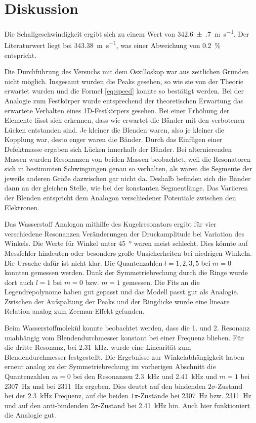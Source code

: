 \section{Diskussion}
\label{sec:Diskussion}

Die Schallgeschwindigkeit ergibt sich zu einem Wert von \SI{342.6(7)}{\meter\per\second}. Der Literaturwert liegt bei \SI{343.38}{\meter\per\second}, was einer Abweichung von \SI{0.2}{\percent} entspricht. 

Die Durchführung des Versuchs mit dem Oszilloskop war aus zeitlichen Gründen nicht möglich. 
Insgesamt wurden die Peaks gesehen, so wie sie von der Theorie erwartet wurden und die Formel \eqref{eq:speed} konnte so bestätigt werden. 
Bei der Analogie zum Festkörper wurde entsprechend der theoretischen Erwartung das erwartete Verhalten eines 1D-Festkörpers gesehen. Bei einer Erhöhung der Elemente lässt sich erkennen, dass wie erwartet die Bänder mit den verbotenen Lücken entstanden sind. Je kleiner die Blenden waren, also je kleiner die Kopplung war, desto enger waren die Bänder. 
Durch das Einfügen einer Defektmasse ergaben sich Lücken innerhalb der Bänder. 
Bei alternierenden Massen wurden Resonanzen von beiden Massen beobachtet, weil die Resonatoren sich in bestimmten Schwingungen genau so verhalten, als wären die Segmente der jeweils anderen Größe dazwischen gar nicht da. Deshalb befinden sich die Bänder dann an der gleichen Stelle, wie bei der konstanten Segmentlänge.
Das Variieren der Blenden entspricht dem Analogon verschiedener Potentiale zwischen den Elektronen. 

Das Wasserstoff Analogon mithilfe des Kugelresonators ergibt für vier verschiedene Resonanzen Veränderungen der Druckamplitude bei Variation des Winkels. Die Werte für Winkel unter \SI{45}{\degree} waren meist schlecht. Dies könnte auf Messfehler hindeuten oder besonders große Unsicherheiten bei niedrigen Winkeln. Die Ursache dafür ist nicht klar. 
Die Quantenzahlen $l=1,2,3,5$ bei $m=0$ konnten gemessen werden. Dank der Symmetriebrechung durch die Ringe wurde dort auch $l = 1$ bei $m=0$ bzw. $m=1$ gemessen. Die Fits an die Legendrepolynome haben gut gepasst und das Modell passt gut als Analogie. 
Zwischen der Aufspaltung der Peaks und der Ringdicke wurde eine lineare Relation analog zum Zeeman-Effekt gefunden. 

Beim Wasserstoffmolekül konnte beobachtet werden, dass die 1. und 2. Resonanz  unabhängig vom Blendendurchmesser konstant bei einer Frequenz blieben. 
Für die dritte Resonanz, bei \SI{2.31}{\kilo\hertz}, wurde eine Linearität zum Blendendurchmesser festgestellt.
Die Ergebnisse zur Winkelabhängigkeit haben erneut analog zu der Symmetriebrechung im vorherigen Abschnitt die Quantenzahlen $m = 0$ bei den Resonanzen \SI{2.3}{\kilo\hertz} und \SI{2.41}{\kilo\hertz} und $m = 1$ bei \SI{2307}{\hertz} und bei \SI{2311}{\hertz} ergeben. Dies deutet auf den bindenden $2 \sigma$-Zustand bei der \SI{2.3}{\kilo\hertz} Frequenz, auf die beiden $1 \pi$-Zustände bei \SI{2307}{\hertz} bzw. \SI{2311}{\hertz} und auf den anti-bindenden $2 \sigma$-Zustand bei \SI{2.41}{\kilo\hertz} hin. 
Auch hier funktioniert die Analogie gut.